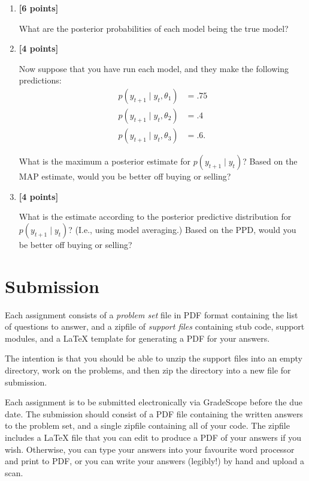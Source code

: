 \documentclass{article}
\newcounter{totalpoints}
\newcommand{\points}[1]{{\addtocounter{totalpoints}{#1}\textbf{[#1 points]}}}
\begin{document}
\begin{enumerate}
\item \points{6}
What are the posterior probabilities of each model being the true model?
\begin{answer}{1.5in}
\end{answer}

\item \points{4}
Now suppose that you have run each model, and they make the following predictions:
\begin{align*}
    p(y_{t+1} \mid y_t, \theta_1) &= .75 \\
    p(y_{t+1} \mid y_t, \theta_2) &= .4 \\
    p(y_{t+1} \mid y_t, \theta_3) &= .6.
\end{align*}

What is the maximum a posterior estimate for $p(y_{t+1} \mid y_t)$?
Based on the MAP estimate, would you be better off buying or selling?

\begin{answer}{1.5in}
\end{answer}

\item \points{4}

What is the estimate according to the posterior predictive distribution for $p(y_{t+1} \mid y_t)$?
(I.e., using model averaging.)
Based on the PPD, would you be better off buying or selling?

\begin{answer}{1.5in}
\end{answer}

\end{enumerate}

\section*{Submission}
Each assignment consists of a \emph{problem set} file in PDF format containing the list of questions to answer, and a zipfile of \emph{support files} containing stub code, support modules, and a \LaTeX{} template for generating a PDF for your answers.

The intention is that you should be able to unzip the support files into an empty directory, work on the problems, and then zip the directory into a new file for submission.

Each assignment is to be submitted electronically via GradeScope before the due date.  The submission should consist of a PDF file containing the written answers to the problem set, and a single zipfile containing all of your code.  The zipfile includes a \LaTeX{} file that you can edit to produce a PDF of your answers if you wish.  Otherwise, you can type your answers into your favourite word processor and print to PDF, or you can write your answers (legibly!) by hand and upload a scan.

%
%
\end{document}
